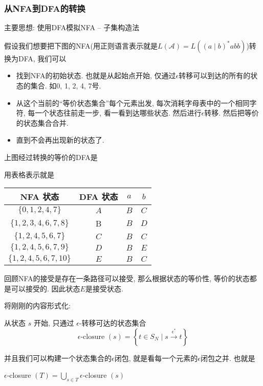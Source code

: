 \documentclass{ctexart}
\begin{document}
\subsubsection{从NFA到DFA的转换} 主要思想: 使用DFA模拟NFA -- 子集构造法

假设我们想要把下图的NFA(用正则语言表示就是$L(\mathcal{A})=L\left((a \mid b)^* a b b\right)$)转换为DFA, 我们可以

\begin{itemize}
    \item 找到NFA的初始状态. 也就是从起始点开始, 仅通过$\epsilon$转移可以到达的所有的状态的集合. 如0, 1, 2, 4, 7号.  
    \item 从这个当前的``等价状态集合''每个元素出发, 每次消耗字母表中的一个相同字符, 每一个状态往前走一步, 看一看到达哪些状态. 然后进行$\epsilon$转移. 然后把等价的状态集合合并. 
    \item 直到不会再出现新的状态了. 
\end{itemize}

上图经过转换的等价的DFA是


用表格表示就是

\begin{center}
    \begin{tabular}{|c|c|c|c|}
        \hline NFA 状态 & DFA 状态 & $a$ & $b$ \\
        \hline$\{0,1,2,4,7\}$ & $A$ & $B$ & $C$ \\
        \hline$\{1,2,3,4,6,7,8\}$ & B & $B$ & $D$ \\
        \hline$\{1,2,4,5,6,7\}$ & $C$ & $B$ & $C$ \\
        \hline$\{1,2,4,5,6,7,9\}$ & $D$ & $B$ & $E$ \\
        \hline$\{1,2,4,5,6,7,10\}$ & $E$ & $B$ & $C$ \\
        \hline
    \end{tabular}
\end{center}

回顾NFA的接受是存在一条路径可以接受, 那么根据状态的等价性, 等价的状态都是可以接受的. 因此状态$E$是接受状态. 


将刚刚的内容形式化: 

\begin{definition}[$\epsilon$闭包]
    从状态 $s$ 开始, 只通过 $\epsilon$-转移可达的状态集合
$$
\epsilon \text {-closure }(s)=\left\{t \in S_N \mid s \xrightarrow{\epsilon^*} t\right\}
$$

并且我们可以构建一个状态集合的$\epsilon$闭包, 就是看每一个元素的$\epsilon$闭包之并. 也就是

$\epsilon$-closure $({T})=\bigcup_{s \in T} \epsilon$-closure $(s)$
\end{definition}
\end{document}
